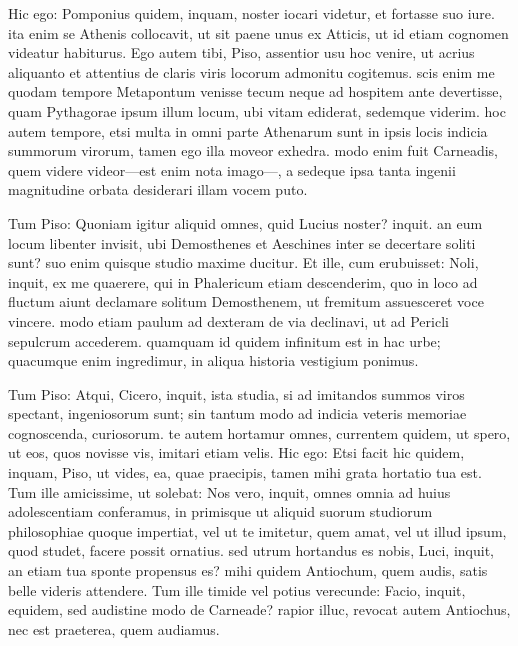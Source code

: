  Hic ego: Pomponius quidem, inquam, noster iocari videtur, et fortasse suo iure. ita enim se Athenis collocavit, ut sit paene unus ex Atticis, ut id etiam cognomen videatur habiturus. Ego autem tibi, Piso, assentior usu hoc venire, ut acrius aliquanto et attentius de claris viris locorum admonitu cogitemus. scis enim me quodam tempore Metapontum venisse tecum neque ad hospitem ante devertisse, quam Pythagorae ipsum illum locum, ubi vitam ediderat, sedemque viderim. hoc autem tempore, etsi multa in omni parte Athenarum sunt in ipsis locis indicia summorum virorum, tamen ego illa moveor exhedra. modo enim fuit Carneadis, quem videre videor—est enim nota imago—, a sedeque ipsa tanta ingenii magnitudine orbata desiderari illam vocem puto.

 Tum Piso: Quoniam igitur aliquid omnes, quid Lucius noster? inquit. an eum locum libenter invisit, ubi Demosthenes et Aeschines inter se decertare soliti sunt? suo enim quisque studio maxime ducitur. Et ille, cum erubuisset: Noli, inquit, ex me quaerere, qui in Phalericum etiam descenderim, quo in loco ad fluctum aiunt declamare solitum Demosthenem, ut fremitum assuesceret voce vincere. modo etiam paulum ad dexteram de via declinavi, ut ad Pericli sepulcrum accederem. quamquam id quidem infinitum est in hac urbe; quacumque enim ingredimur, in aliqua historia vestigium ponimus.

 Tum Piso: Atqui, Cicero, inquit, ista studia, si ad imitandos summos viros spectant, ingeniosorum sunt; sin tantum modo ad indicia veteris memoriae cognoscenda, curiosorum. te autem hortamur omnes, currentem quidem, ut spero, ut eos, quos novisse vis, imitari etiam velis. Hic ego: Etsi facit hic quidem, inquam, Piso, ut vides, ea, quae praecipis, tamen mihi grata hortatio tua est. Tum ille amicissime, ut solebat: Nos vero, inquit, omnes omnia ad huius adolescentiam conferamus, in primisque ut aliquid suorum studiorum philosophiae quoque impertiat, vel ut te imitetur, quem amat, vel ut illud ipsum, quod studet, facere possit ornatius. sed utrum hortandus es nobis, Luci, inquit, an etiam tua sponte propensus es? mihi quidem Antiochum, quem audis, satis belle videris attendere. Tum ille timide vel potius verecunde: Facio, inquit, equidem, sed audistine modo de Carneade? rapior illuc, revocat autem Antiochus, nec est praeterea, quem audiamus.


